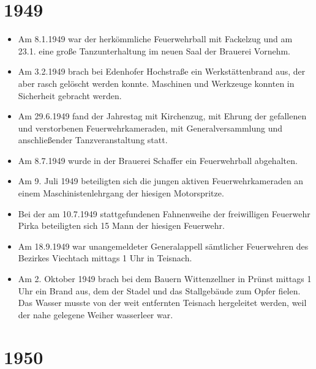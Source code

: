 \documentclass[12pt,a4paper]{book}
\begin{document}
\section*{1949}

\begin{itemize}
\item Am 8.1.1949 war der herkömmliche Feuerwehrball mit Fackelzug und am 23.1.
eine große Tanzunterhaltung im neuen Saal der Brauerei Vornehm.

\item Am 3.2.1949 brach bei Edenhofer Hochstraße ein Werkstättenbrand aus, der
aber rasch gelöscht werden konnte. Maschinen und Werkzeuge konnten in Sicherheit
gebracht werden.

\item Am 29.6.1949 fand der Jahrestag mit Kirchenzug, mit Ehrung der gefallenen
und verstorbenen Feuerwehrkameraden, mit Generalversammlung und anschließender
Tanzveranstaltung statt.

\item Am 8.7.1949 wurde in der Brauerei Schaffer ein Feuerwehrball abgehalten.

\item Am 9. Juli 1949 beteiligten sich die jungen aktiven Feuerwehrkameraden an
einem Maschinistenlehrgang der hiesigen Motorspritze.

\item Bei der am 10.7.1949 stattgefundenen Fahnenweihe der freiwilligen
Feuerwehr Pirka beteiligten sich 15 Mann der hiesigen Feuerwehr.

\item Am 18.9.1949 war unangemeldeter Generalappell sämtlicher Feuerwehren des
Bezirkes Viechtach mittags 1 Uhr in Teisnach.

\item Am 2. Oktober 1949 brach bei dem Bauern Wittenzellner in Prünst mittags 1
Uhr ein Brand aus, dem der Stadel und das Stallgebäude zum Opfer fielen. Das
Wasser musste von der weit entfernten Teisnach hergeleitet werden, weil der nahe
gelegene Weiher wasserleer war.
\end{itemize}

\section*{1950}
\end{document}
